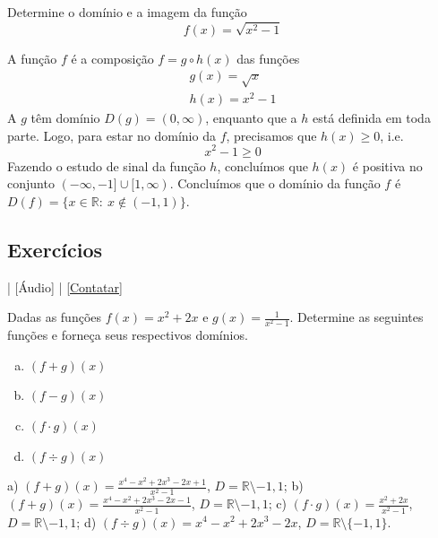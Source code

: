 \begin{exer}
  Determine o domínio e a imagem da função
  \begin{equation}
    f(x) = \sqrt{x^2-1}
  \end{equation}
\end{exer}
\begin{resol}
  A função $f$ é a composição $f = g\circ h(x)$ das funções
  \begin{gather}
    g(x) = \sqrt{x}\\
    h(x) = x^2-1
  \end{gather}
  A $g$ têm domínio $D(g) = (0,\infty)$, enquanto que a $h$ está definida em toda parte. Logo, para estar no domínio da $f$, precisamos que $h(x)\geq0$, i.e.
  \begin{equation}
    x^2-1\geq 0
  \end{equation}
  Fazendo o estudo de sinal da função $h$, concluímos que $h(x)$ é positiva no conjunto $(-\infty, -1]\cup [1, \infty)$. Concluímos que o domínio da função $f$ é $D(f) = \{x\in\mathbb{R}:~x\not\in (-1,1)\}$. 
\end{resol}

\subsection*{Exercícios}

\begin{flushright}
  [Vídeo] | [Áudio] | \href{https://phkonzen.github.io/notas/contato.html}{[Contatar]}
\end{flushright}

\begin{exer}
  Dadas as funções $f(x)=x^2+2x$ e $g(x) = \frac{1}{x^2-1}$. Determine as seguintes funções e forneça seus respectivos domínios.
  \begin{enumerate}[a)]
  \item $(f+g)(x)$
  \item $(f-g)(x)$
  \item $(f\cdot g)(x)$
  \item $(f\div g)(x)$
  \end{enumerate}
\end{exer}
\begin{resp}
  a) $\displaystyle (f+g)(x)=\frac{x^4-x^2+2x^3-2x+1}{x^2-1}$, $D=\mathbb{R}\setminus{-1,1}$; b) $\displaystyle (f+g)(x)=\frac{x^4-x^2+2x^3-2x-1}{x^2-1}$, $D=\mathbb{R}\setminus{-1,1}$; c) $\displaystyle (f\cdot g)(x) = \frac{x^2+2x}{x^2-1}$, $D=\mathbb{R}\setminus{-1,1}$;  d) $\displaystyle (f\div g)(x) = x^4-x^2+2x^3-2x$, $D=\mathbb{R}\setminus\{-1,1\}$.
\end{resp}

